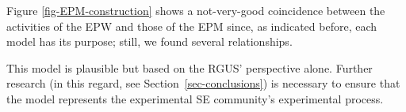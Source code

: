 Figure \ref{fig-EPM-construction} shows a not-very-good coincidence between the activities of the EPW and those of the EPM since, as indicated before, each model has its purpose; still, we found several relationships.

This model is plausible but based on the RGUS' perspective alone. Further research (in this regard, see Section~\ref{sec-conclusions}) is necessary to ensure that the model represents the experimental SE community's experimental process.